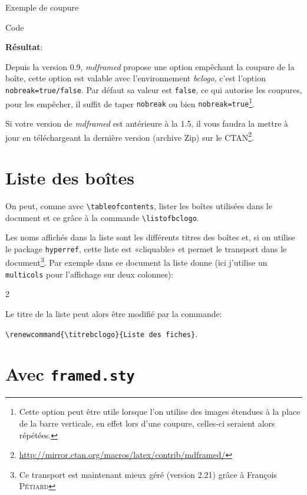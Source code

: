 \documentclass[a4paper,10pt,frenchb]{article}
\newenvironment*{demo}{%
\VerbatimOut{toto.txt}%
}%
{%
\endVerbatimOut%
\begin{bclogo}[margeG=1,logo=\bccrayon,couleurBarre=Gray,barre=wave,noborder]{Code}%
\begin{footnotesize}%
%
\end{footnotesize}%
\end{bclogo}%
\noindent\textbf{Résultat}:\par\smallskip
%
}%
\newcommand*\cmd{\color{Maroon}}%
\begin{document}
\begin{demo}
\begin{bclogo}[logo=\bcplume,couleur=PaleGoldenrod,ombre,epBord=0.8,barre=wave,%
  couleurBarre=black]{Exemple de coupure}%
  \lipsum[1-13]
\end{bclogo}
\end{demo}

Depuis la version 0.9, \emph{mdframed} propose une option empêchant la
coupure de la boîte, cette option est valable avec l'environnement
\emph{bclogo}, c'est l'option {\cmd\verb|nobreak=true/false|}. Par
défaut sa valeur est \texttt{false}, ce qui autorise les coupures,
pour les empêcher, il suffit de taper {\cmd\verb|nobreak|} ou bien
{\cmd\verb|nobreak=true|}\footnote{Cette option peut être utile
  lorsque l'on utilise des images étendues à la place de la barre
  verticale, en effet lors d'une coupure, celles-ci seraient alors
  répétées.}.


Si votre version de \emph{mdframed} est antérieure à la 1.5, il vous
faudra la mettre à jour en téléchargeant la dernière version (archive
Zip) sur le
CTAN\footnote{\url{http://mirror.ctan.org/macros/latex/contrib/mdframed/}}.

\section{Liste des boîtes}

On peut, comme avec \verb+\tableofcontents+, lister les boîtes
utilisées dans le document et ce grâce à la commande
{\cmd\verb|\listofbclogo|}.

Les noms affichés dans la liste sont les différents titres des boîtes
et, si on utilise le package \verb+hyperref+, cette liste est
«cliquable» et permet le transport dans le document\footnote{Ce
  transport est maintenant mieux géré (version 2.21) grâce à François
  \textsc{Pétiard}}. Par exemple dans ce document la liste donne (ici
j'utilise un \texttt{multicols} pour l'affichage sur deux colonnes):

\begin{multicols}{2}
\listofbclogo
\end{multicols}

Le titre de la liste peut alors être modifié par la commande:

\hfil{\cmd\verb|\renewcommand{\titrebclogo}{Liste des fiches}|}.\hfil

\section{Avec \texttt{framed.sty}}
\end{document}
